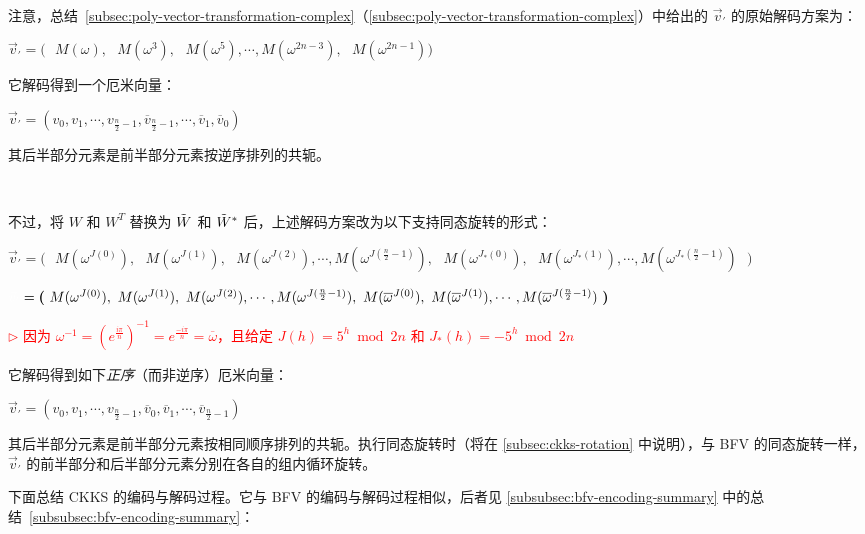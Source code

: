 $ $


注意，总结~\ref*{subsec:poly-vector-transformation-complex}（\autoref{subsec:poly-vector-transformation-complex}）中给出的 $\vec{v}_{'}$ 的原始解码方案为：

$\vec{v}_{'} = \bm{(} \text{ } M(\omega), \text{ } M(\omega^3), \text{ } M(\omega^5), \cdots, M(\omega^{2n-3}), \text{ } M(\omega^{2n-1}) \bm{)}$

它解码得到一个厄米向量：

$\vec{v}_{'} = (v_0, v_1, \cdots, v_{\frac{n}{2} - 1}, \overline v_{\frac{n}{2} - 1}, \cdots, \overline v_1, \overline v_0 )$

其后半部分元素是前半部分元素按逆序排列的共轭。

$ $

不过，将 $W$ 和 $W^T$ 替换为 $\tilde W$ 和 $\tilde W^*$ 后，上述解码方案改为以下支持同态旋转的形式：


$\vec{v}_{'} =  \bm{(} \text{ }
M(\omega^{J(0)}), \text{ } M(\omega^{J(1)}), \text{ } M(\omega^{J(2)}), \cdots,  M(\omega^{J(\frac{n}{2}-1)}), \text{ } M(\omega^{J_*(0)}), \text{ } M(\omega^{J_*(1)}), \cdots,  M(\omega^{J_*(\frac{n}{2}-1)}) \text{ } \bm{)}$

$\textcolor{white}{\vec{v}_{'}} =  \bm{(} \text{ }
M(\omega^{J(0)}), \text{ } M(\omega^{J(1)}), \text{ } M(\omega^{J(2)}), \cdots,  M(\omega^{J(\frac{n}{2}-1)}), \text{ } M(\overline\omega^{J(0)}), \text{ } M(\overline\omega^{J(1)}), \cdots,  M(\overline\omega^{J(\frac{n}{2}-1)}) \text{ } \bm{)}$

\textcolor{red}{ $\rhd$ 因为 $\omega^{-1} = (e^{\frac{i\pi}{n}})^{-1} = e^{\frac{-i\pi}{n}} = \overline\omega$，且给定 $J(h) = 5^h \bmod 2n$ 和 $J_*(h) = -5^h \bmod 2n$}

它解码得到如下\textit{正序}（而非逆序）厄米向量：

$\vec{v}_{'} = (v_0, v_1, \cdots, v_{\frac{n}{2} - 1}, \overline v_0, \overline v_1, \cdots, \overline v_{\frac{n}{2} - 1})$

其后半部分元素是前半部分元素按相同顺序排列的共轭。执行同态旋转时（将在 \autoref{subsec:ckks-rotation} 中说明），与 BFV 的同态旋转一样，$\vec{v}_{'}$ 的前半部分和后半部分元素分别在各自的组内循环旋转。



下面总结 CKKS 的编码与解码过程。它与 BFV 的编码与解码过程相似，后者见 \autoref{subsubsec:bfv-encoding-summary} 中的总结~\ref*{subsubsec:bfv-encoding-summary}：

